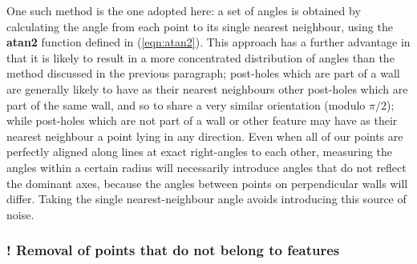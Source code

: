 \documentclass[../../ArchStats.tex]{subfiles}
\begin{document}
One such method is the one adopted here: a set of angles is obtained by calculating the angle from each point to its single nearest neighbour, using the \textbf{atan2} function defined in (\ref{eqn:atan2}). This approach has a further advantage in that it is likely to result in a more concentrated distribution of angles than the method discussed in the previous paragraph; post-holes which are part of a wall are generally likely to have as their nearest neighbours other post-holes which are part of the same wall, and so to share a very similar orientation (modulo $\pi/2$); while post-holes which are not part of a wall or other feature may have as their nearest neighbour a point lying in any direction. Even when all of our points are perfectly aligned along lines at exact right-angles to each other, measuring the angles within a certain radius will necessarily introduce angles that do not reflect the dominant axes, because the angles between points on perpendicular walls will differ. Taking the single nearest-neighbour angle avoids introducing this source of noise. 

\subsubsection{! Removal of points that do not belong to features}


\end{document}
